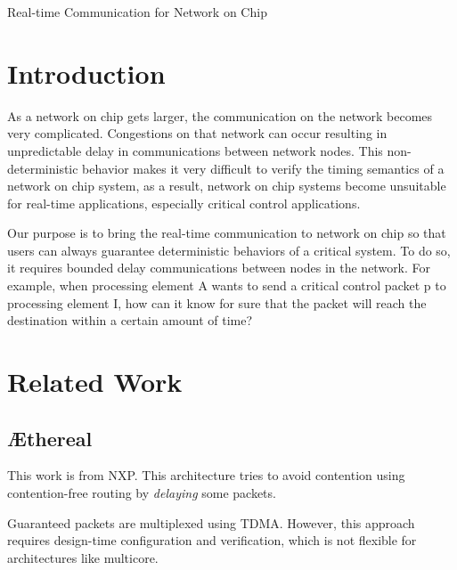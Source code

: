 \documentclass[10pt]{article}
\begin{document}
\begin{center}
\huge{Real-time Communication for Network on Chip} \hspace{0.5cm}
\end{center}
\section{Introduction}
As a network on chip gets larger, the communication on the network becomes 
very complicated. Congestions on that network can occur resulting in unpredictable 
delay in communications between network nodes. This non-deterministic behavior 
makes it very difficult to verify the timing semantics of a network on chip 
system, as a result, network on chip systems become unsuitable for real-time 
applications, especially critical control applications.

Our purpose is to bring the real-time communication to network on chip so that 
users can always guarantee deterministic behaviors of a critical system. To do 
so, it requires bounded delay communications between nodes in the network. 
For example, when processing element A wants to send a critical control packet 
p to processing element I, how can it know for sure that the packet will reach 
the destination within a certain amount of time? 
\section{Related Work}
\subsection{\AE thereal}
This work \cite{Goossens_chapter4} is from NXP. This architecture tries to avoid
contention using contention-free routing by {\em delaying} some packets. 

Guaranteed packets are multiplexed using TDMA. However, this approach requires
design-time configuration and verification, which is not flexible for architectures
like multicore.
\end{document}
